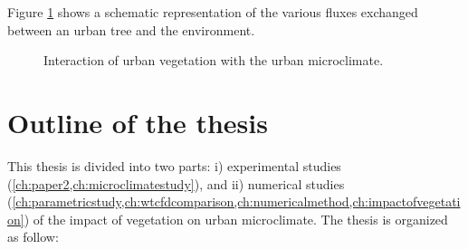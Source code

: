 Figure \ref{fig:vegetation_fluxes} shows a schematic representation of the various fluxes exchanged between an urban tree and the environment. 

\begin{figure}[h]
	\centering
	\caption{Interaction of urban vegetation with the urban microclimate.}
	\label{fig:vegetation_fluxes}
\end{figure}	



\section{Outline of the thesis}

This thesis is divided into two parts: i) experimental studies (\cref{ch:paper2,ch:microclimatestudy}), and ii) numerical studies (\cref{ch:parametricstudy,ch:wtcfdcomparison,ch:numericalmethod,ch:impactofvegetation}) of the impact of vegetation on urban microclimate. The thesis is organized as follow:
